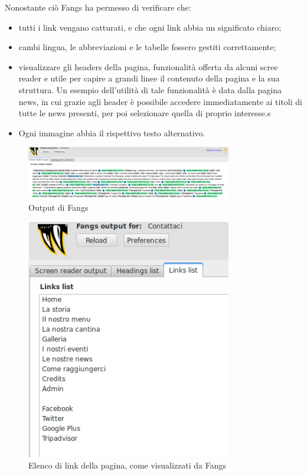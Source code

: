 Nonostante ciò Fangs ha permesso di verificare che:
\begin{itemize}
\item tutti i link vengano catturati, e che ogni link abbia un significato chiaro;
\item cambi lingua, le abbreviazioni e le tabelle fossero gestiti correttamente;
\item visualizzare gli headers della pagina, funzionalità offerta da alcuni scree reader e utile per capire a grandi linee il contenuto della pagina e la sua struttura. Un esempio dell'utilità di tale funzionalità è data dalla pagina news, in cui grazie agli header è possibile accedere immediatamente ai titoli di tutte le news presenti, per poi selezionare quella di proprio interesse.s
\item Ogni immagine abbia il rispettivo testo alternativo.
\end{itemize} 

\begin{figure}[H]
		\centering \includegraphics[width=0.8\textwidth]{images/fangs.png}
		\caption{Output di Fangs}
	\end{figure}
	
	\begin{figure}[H]
		\centering \includegraphics[width=0.8\textwidth]{images/fangsLink.png}
		\caption{Elenco di link della pagina, come visualizzati da Fangs}
	\end{figure}

